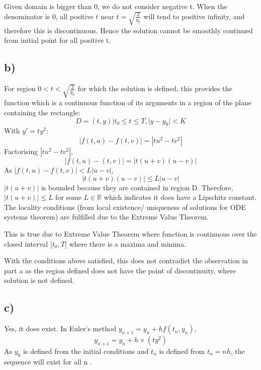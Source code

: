 \documentclass{article}
\begin{document}
Given domain is bigger than 0, we do not consider negative t. When the denominator is 0, all positive $t$ near $t={\sqrt{\frac{2}{y_0}}}$ will tend to positive infinity, and therefore this is discontinuous. Hence the solution cannot be smoothly continued from initial point for all positive t. 

\subsection*{b)} For region $0<t<\sqrt{\frac{2}{y_0}}$ for which the solution is defined, this provides the function which is a continuous function of its arguments in a region of the plane containing the rectangle:
\begin{equation*}
    D={(t,y)|t_0\leq t\leq T, |y-y_0| <K}
\end{equation*}
With $y'=ty^2$:
\begin{equation*}
    |f(t,u)-f(t,v)|= |tu^2-tv^2|
\end{equation*}
Factorising $|tu^2-tv^2|$, 
\begin{equation*}
    |f(t,u)-(t,v)|=|t(u+v)(u-v)|
\end{equation*}
As $|f(t,u)-f(t,v)|<L|u-v|$, 
\begin{equation*}
    |t(u+v)(u-v)|\leq L|u-v|
\end{equation*}
$|t(u+v)|$ is bounded because they are contained in region D. Therefore, $|t(u+v)|\leq L$ for some $L\in\mathbb{R}$ which indicates it does have a Lipschitz constant. The locality conditions (from local existence/ uniqueness of solutions for ODE systems theorem) are fulfilled due to the Extreme Value Theorem.

This is true due to Extreme Value Theorem where function is continuous over the closed interval [$t_0,T$] where there is a maxima and minima. 

With the conditions above satisfied, this does not contradict the observation in part a as the region defined does not have the point of discontinuity, where solution is not defined. 

\subsection*{c)}
Yes, it does exist. In Euler's method $y_{n+1}=y_n + hf(t_n,y_n)$,
\begin{equation*}
    y_{n+1}=y_n+h \times (ty^2)
\end{equation*}
As $y_0$ is defined from the initial conditions and $t_n$ is defined from $t_n=nh$, the sequence will exist for all n .
\end{document}
